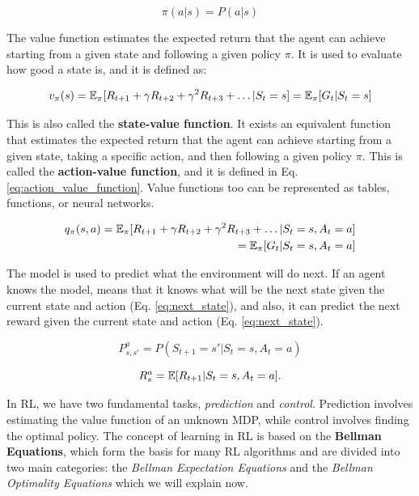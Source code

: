 \begin{equation} \label{eq:policy}
    \pi(a|s) = P(a|s)
\end{equation}



The value function estimates the expected return that the agent can achieve starting from a given state and following a given policy $\pi$.
It is used to evaluate how good a state is, and it is defined as:

\begin{equation} \label{eq:value_function}
    v_{\pi}(s) = \operatorname{\mathbb{E}}_{\pi}[R_{t+1} + \gamma R_{t+2} + \gamma^2 R_{t+3} + \dots | S_t = s] = \operatorname{\mathbb{E}}_{\pi}[G_t | S_t = s]
\end{equation}

This is also called the \textbf{state-value function}.
It exists an equivalent function that estimates the expected return that the agent can achieve starting from a given state, taking a specific action, and then following a given policy $\pi$.
This is called the \textbf{action-value function}, and it is defined in Eq. \ref{eq:action_value_function}.
Value functions too can be represented as tables, functions, or neural networks.

\begin{equation} \label{eq:action_value_function}
\begin{split}
    q_{\pi}(s, a) = \operatorname{\mathbb{E}}_{\pi}[R_{t+1} + \gamma R_{t+2} + \gamma^2 R_{t+3} + \dots | S_t = s, A_t = a] \\
    = \operatorname{\mathbb{E}}_{\pi}[G_t | S_t = s, A_t = a]
\end{split}
\end{equation}


The model is used to predict what the environment will do next.
If an agent knows the model, means that it knows what will be the next state given the current state and action (Eq. \ref{eq:next_state}), and also, it can predict the next reward given the current state and action (Eq. \ref{eq:next_state}). 

\begin{equation} \label{eq:next_state}
    P_{s, s'}^a = P(S_{t+1} = s' | S_t = s, A_t = a)
\end{equation}

\begin{equation} \label{eq:next_reward}
    R_s^a = \operatorname{\mathbb{E}}[R_{t+1} | S_t = s, A_t = a].
\end{equation}

In RL, we have two fundamental tasks, \textit{prediction} and \textit{control}. 
Prediction involves estimating the value function of an unknown MDP, while control involves finding the optimal policy.
The concept of learning in RL is based on the \textbf{Bellman Equations}, which form the basis for many RL algorithms and are divided into two main categories: the \textit{Bellman Expectation Equations} and the \textit{Bellman Optimality Equations} which we will explain now.


